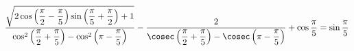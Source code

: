 \begin{ex}[type=prove_identity]
	\begin{condition}
		\( \dfrac{\sqrt{2\cos\left( \dfrac{\pi}{2}-\dfrac{\pi}{5} \right)\sin\left( \dfrac{\pi}{5}+\dfrac{\pi}{2} \right)+1}}{\cos^2\left( \dfrac{\pi}{2}+\dfrac{\pi}{5} \right)-\cos^2\left( \pi-\dfrac{\pi}{5} \right)}-\dfrac{2}{\cosec\left( \dfrac{\pi}{2}+\dfrac{\pi}{5} \right)-\cosec\left( \pi-\dfrac{\pi}{5} \right)}+\cos\dfrac{\pi}{5}=\sin\dfrac{\pi}{5} \)
	\end{condition}
\end{ex}